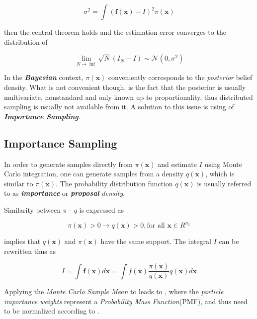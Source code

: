 \[ \sigma^2 = \int (\mathbf{f}(\mathbf{x})- I)^2 \pi(\mathbf{x}) \]


then the central theorem holds and the estimation error converges to the distribution of 

\begin{equation}\label{eq:MCI4}
\lim_{N\rightarrow \inf} \sqrt{N}(I_N - I) \sim \mathcal{N}(0,
\sigma^2)
\end{equation}


In the \textbf{\emph{Bayesian}} context, $\pi(\mathbf{x})$ conveniently corresponds to the \emph{posterior} belief density. What is not convenient though, is the fact that the posterior is usually multivariate, nonstandard and only known up to proportionality, thus distributed sampling is usually not available from it. A solution to this issue is using of \emph{\textbf{Importance Sampling}}.

\subsection{Importance Sampling}

In order to generate samples directly from $\pi (\mathbf{x})$ and estimate $I$ using Monte Carlo integration, one can generate samples from a density $q(\mathbf{x})$, which is similar to $\pi(\mathbf{x})$. The probability distribution function $q(\mathbf{x})$ is usually referred to as \emph{\textbf{importance }}or \emph{\textbf{proposal}} \emph{density}.


Similarity between $\pi \text{ - } q $ is expressed as

\begin{equation}\label{eq:proposal1}
\pi(\mathbf{x}) > 0 \rightarrow q(\mathbf{x})>0 , \text{for all } \mathbf{x} \in R^{n_x}
\end{equation}

  implies that $q(\mathbf{x})$ and $\pi(\mathbf{x})$ have the same support. The integral $I$ can be rewritten thus as

\begin{equation}\label{eq:MCIntegral}
I = \int \mathbf{f}(\mathbf{x}) d\mathbf{x} = \int f(\mathbf{x}) \frac{\pi(\mathbf{x})}{q(\mathbf{x})}q(\mathbf{x}) d\mathbf{x}
\end{equation}


Applying the \emph{Monte Carlo Sample Mean} to  leads to  , where the \emph{particle importance weights} represent a \emph{Probability Mass Function}(PMF), and thus need to be normalized according to .




